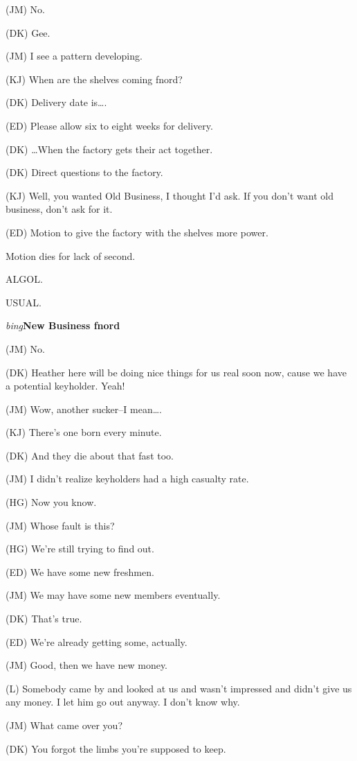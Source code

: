(JM) No.

(DK) Gee.

(JM) I see a pattern developing.

(KJ) When are the shelves coming fnord?

(DK) Delivery date is\ldots{}.

(ED) Please allow six to eight weeks for delivery.

(DK) \ldots{}When the factory gets their act together.

(DK) Direct questions to the factory.

(KJ) Well, you wanted Old Business, I thought I'd ask. If
you don't want old business, don't ask for it.

(ED) Motion to give the factory with the shelves more power.

Motion dies for lack of second.

ALGOL.

USUAL.

\vspace{0.15in}
{\em bing\/}{\bf New Business fnord\/}

(JM) No.

(DK) Heather here will be doing nice things for us real soon now,
cause we have a potential keyholder.  Yeah!

(JM) Wow, another sucker--I mean\ldots{}.

(KJ) There's one born every minute.

(DK) And they die about that fast too.

(JM) I didn't realize keyholders had a high casualty rate.

(HG) Now you know.

(JM) Whose fault is this?

(HG) We're still trying to find out.

(ED) We have some new freshmen.

(JM) We may have some new members eventually.

(DK) That's true.

(ED) We're already getting some, actually.

(JM) Good, then we have new money.

(L) Somebody came by and looked at us and wasn't impressed and
didn't give us any money.  I let him go out anyway.  I don't
know why.

(JM) What came over you?

(DK) You forgot the limbs you're supposed to keep.

